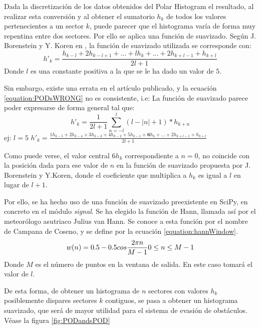 Dada la discretización de los datos obtenidos del Polar Histogram el resultado, al realizar esta conversión y al obtener el sumatorio $h_k$ de todos los valores pertenecientes a un sector $k$, puede parecer que el histograma varía de forma muy repentina entre dos sectores. Por ello se aplica una función de suavizado. 
Según J. Borenstein y Y. Koren en \citep{art:BorensteinKorenVFH}, la función de suavizado utilizada se corresponde con: 
\begin{equation}
\label{equation:PODsWRONG}
h'_k = \frac{h_{k-l} +2h_{k-l+1} + ... + lh_k + ... + 2h_{k+l-1} + h_{k+l}}{2l+1}
\end{equation}
Donde $l$  es una constante positiva a la que se le ha dado un valor de $5$. 

Sin embargo, existe una errata en el artículo publicado, y la ecuación \ref{equation:PODsWRONG} no es consistente, i.e:
La función de suavizado parece poder expresarse de forma general tal que:
\begin{equation}
\label{equation:PODsWRONGgen}
h'_k =\frac{1}{2l+1} \sum_{n=-l}^{l} (l-  |n| +1)*h_{k+n}
\end{equation}
ej: $l = 5$ $ h'_k = \frac{1h_{k-5} +2h_{k-4} + 3h_{k-3} + 4h_{k-2} + 5h_{k-1} + \textbf{6}h_k + ... + 2h_{k+l-1} + h_{k+l}}{2l+1} $

Como puede verse, el valor central $ 6h_k $ correspondiente a $n=0$, no coincide con la posición dada para ese valor de $n$ en la función de suavizado propuesta por J. Borenstein y Y.Koren, donde el coeficiente que multiplica a $h_k$ es igual a $l$ en lugar de $l+1$.

Por ello, se ha hecho uso de una función de suavizado preexistente en SciPy, en concreto en el módulo \textit{signal}. Se ha elegido la función de Hann, llamada así por el meteorólogo asutriaco Julius van Hann. Se conoce a esta función por el nombre de Campana de Coseno, y se define por la ecuación \ref{equation:hannWindow}.
\begin{equation}
\label{equation:hannWindow}
w(n)=0.5 - 0.5 cos\frac{2 \pi n}{M-1}\\
0 \leq n \leq M-1
\end{equation}
Donde $M$ es el número de puntos en la ventana de salida. En este caso tomará el valor de $l$.

De esta forma, de obtener un histograma de $n$ sectores con valores $h_k$ posiblemente dispares sectores $k$ contiguos, se pasa a obtener un histograma suavizado, que será de mayor utilidad para el sistema de evasión de obstáculos. Véase la figura \ref{fig:PODandsPOD}

